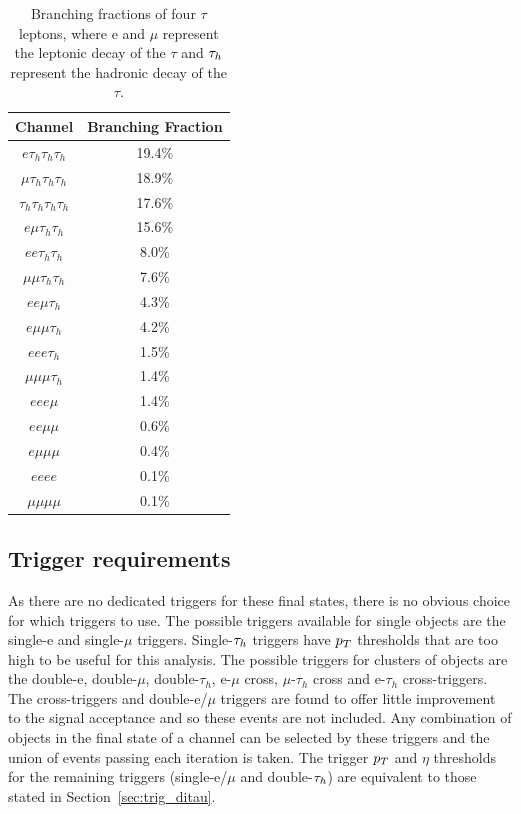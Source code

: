\begin{table}[t]
    \centering
    \begin{tabular}{|c|c|}
         \hline
         Channel & Branching Fraction  \\
         \hline
         \hline
         $e \tau_h \tau_h \tau_h$ & 19.4\% \\
         $\mu \tau_h \tau_h \tau_h$ & 18.9\% \\
         $\tau_h \tau_h \tau_h \tau_h$ & 17.6\% \\
         $e \mu \tau_h \tau_h$ & 15.6\% \\
         $e e \tau_h \tau_h$ & 8.0\% \\
         $\mu \mu \tau_h \tau_h$ & 7.6\% \\
         $e e \mu \tau_h$ & 4.3\% \\
         $e \mu \mu \tau_h$ & 4.2\% \\
         $e e e \tau_h$ & 1.5\% \\
         $\mu \mu \mu \tau_h$ & 1.4\% \\
         $e e e \mu$ & 1.4\% \\
         $e e \mu \mu$ & 0.6\% \\
         $e \mu \mu \mu$ & 0.4\% \\
         $e e e e$ & 0.1\% \\
         $\mu \mu \mu \mu$ & 0.1\% \\
         \hline
    \end{tabular}
    \caption[Branching fractions of four $\tau$ leptons.]{Branching fractions of four $\tau$ leptons, where e and $\mu$ represent the leptonic decay of the $\tau$ and $\tau_{h}$ represent the hadronic decay of the $\tau$.}
    \label{tab:4tau_bf} 
\end{table}

\subsection{Trigger requirements}

As there are no dedicated triggers for these final states, there is no obvious choice for which triggers to use. 
The possible triggers available for single objects are the single-e and single-$\mu$ triggers. 
Single-$\tau_{h}$ triggers have $p_{T}$ thresholds that are too high to be useful for this analysis.
The possible triggers for clusters of objects are the double-e, double-$\mu$, double-$\tau_h$, e-$\mu$ cross, $\mu$-$\tau_h$ cross and e-$\tau_h$ cross-triggers.
The cross-triggers and double-e/$\mu$ triggers are found to offer little improvement to the signal acceptance and so these events are not included.
Any combination of objects in the final state of a channel can be selected by these triggers and the union of events passing each iteration is taken. 
The trigger $p_{T}$ and $\eta$ thresholds for the remaining triggers (single-e/$\mu$ and double-$\tau_{h}$) are equivalent to those stated in Section~\ref{sec:trig_ditau}.

